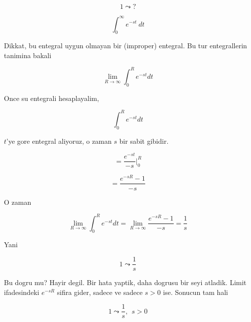 \documentclass[12pt,fleqn]{article}
\begin{document}
\[ 1 \leadsto ? \]

\[ \int_0^{\infty} e^{-st} \ dt \]

Dikkat, bu entegral uygun olmayan bir (improper) entegral. Bu tur
entegrallerin tanimina bakali 

\[ \lim_{R \to \infty}  \int_{0}^{R} e^{-st} dt  \]

Once su entegrali hesaplayalim, 

\[  \int_{0}^{R} e^{-st} dt \]

$t$'ye gore entegral aliyoruz, o zaman $s$ bir sabit gibidir. 

\[  = \frac{ e^{-st}}{-s}  \bigg|_{0}^{R} \]

\[ = \frac{e^{-sR} - 1}{-s} \]

O zaman 

\[ \lim_{R \to \infty}  \int_{0}^{R} e^{-st} dt  = 
\lim_{R \to \infty} \frac{e^{-sR} - 1}{-s}  = 
\frac{1}{s}
\]

Yani 

\[ 1 \leadsto \frac{1}{s} \]

Bu dogru mu? Hayir degil. Bir hata yaptik, daha dogrusu bir seyi
atladik. Limit ifadesindeki $e^{-sR}$ sifira gider, sadece ve sadece $s >
0$ ise. 
Sonucun tam hali 

\[ 1 \leadsto \frac{1}{s}, \ \ s > 0 \]
\end{document}
